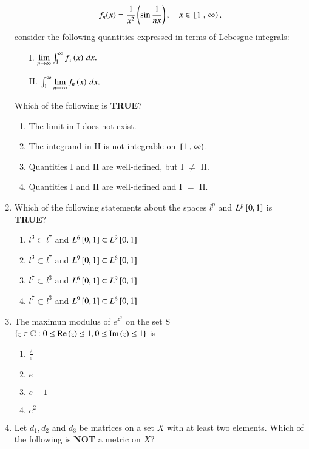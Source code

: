 \documentclass[journal]{IEEEtran}
\begin{document}
\begin{enumerate}
\begin{align}
f_n(x) = \frac{1}{x^2} \left(\sin\frac{1}{n x}\right), \quad x \in {}\left[1\right., \left.\infty\right),
\end{align}
consider the following quantities expressed in terms of Lebesgue integrals:
\begin{enumerate}
    \item[I.] $\lim\limits_{n \to \infty} \int_1^\infty f_x\left(x\right) \, dx.$
    \item[II.] $\int_1^\infty \lim\limits_{n \to \infty} f_n\left(x\right) \, dx.$
\end{enumerate}
Which of the following is \textbf{TRUE}?
\begin{enumerate}
    \item The limit in I does not exist.
    \item The integrand in II is not integrable on ${}\left[1\right., \left.\infty\right)$.
    \item Quantities I and II are well-defined, but I $\neq$ II.
    \item Quantities I and II are well-defined and I $=$ II.
\end{enumerate}
\item Which of the following statements about the spaces $l^p$ and $L^p{}\left[0,1\right]$ is \textbf{TRUE}?
\begin{enumerate}
    \item $l^3 \subset l^7$ and $L^6{}\left[0,1\right] \subset L^9{}\left[0,1\right]$
    \item $l^3 \subset l^7$ and $L^9{}\left[0,1\right] \subset L^6{}\left[0,1\right]$
    \item $l^7 \subset l^3$ and $L^6{}\left[0,1\right] \subset L^9{}\left[0,1\right]$
    \item $l^7 \subset l^3$ and $L^9{}\left[0,1\right] \subset L^6{}\left[0,1\right]$
\end{enumerate}
\item The maximun modulus of $e^{z^2}$ on the set S=$\left\{ z \in \mathbb{C} : 0 \leq \text{Re}\left(z\right) \leq 1, 0 \leq \text{Im}\left(z\right) \leq 1\right\}$ is
\begin{enumerate}
    \item $\frac{2}{e}$
    \item $e$
    \item $e+1$
    \item $e^2$
\end{enumerate}
\item Let $d_1,d_2$ and $d_3$ be matrices on a set $X$ with at least two elements. Which of the following is \textbf{NOT} a metric on $X$?
\begin{enumerate}

\end{enumerate}
\end{enumerate}
\end{document}
